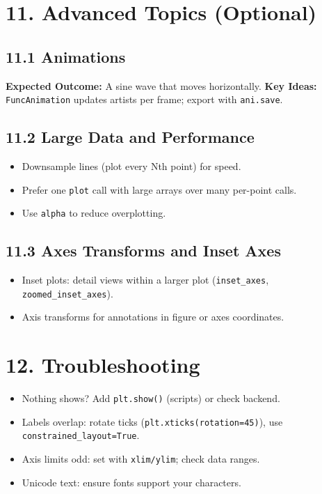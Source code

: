 \section{11. Advanced Topics (Optional)}
\subsection{11.1 Animations}
\textbf{Expected Outcome:} A sine wave that moves horizontally.
\textbf{Key Ideas:} \texttt{FuncAnimation} updates artists per frame; export with \texttt{ani.save}.

\subsection{11.2 Large Data and Performance}
\begin{itemize}
    \item Downsample lines (plot every Nth point) for speed.
    \item Prefer one \texttt{plot} call with large arrays over many per-point calls.
    \item Use \texttt{alpha} to reduce overplotting.
\end{itemize}

\subsection{11.3 Axes Transforms and Inset Axes}
\begin{itemize}
    \item Inset plots: detail views within a larger plot (\texttt{inset\_axes}, \texttt{zoomed\_inset\_axes}).
    \item Axis transforms for annotations in figure or axes coordinates.
\end{itemize}

\section{12. Troubleshooting}
\begin{itemize}
    \item Nothing shows? Add \texttt{plt.show()} (scripts) or check backend.
    \item Labels overlap: rotate ticks (\texttt{plt.xticks(rotation=45)}), use \texttt{constrained\_layout=True}.
    \item Axis limits odd: set with \texttt{xlim/ylim}; check data ranges.
    \item Unicode text: ensure fonts support your characters.
\end{itemize}

